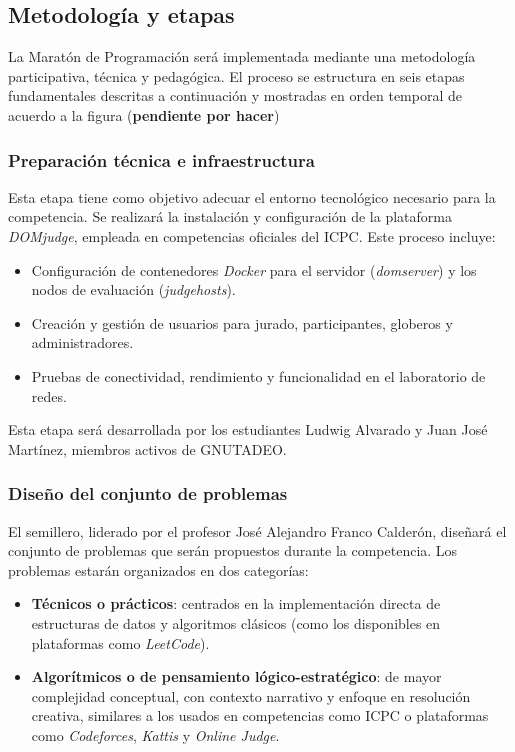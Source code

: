 \documentclass{article}
\begin{document}
\subsection{Metodología y etapas}

La Maratón de Programación será implementada mediante una metodología participativa, técnica y pedagógica. El proceso se estructura en seis etapas fundamentales descritas a continuación y mostradas en orden temporal de acuerdo a la figura (\textbf{pendiente por hacer})

\subsubsection{Preparación técnica e infraestructura}

Esta etapa tiene como objetivo adecuar el entorno tecnológico necesario para la competencia. Se realizará la instalación y configuración de la plataforma \textit{DOMjudge}, empleada en competencias oficiales del ICPC. Este proceso incluye:

\begin{itemize}
  \item Configuración de contenedores \textit{Docker} para el servidor (\textit{domserver}) y los nodos de evaluación (\textit{judgehosts})\cite{domjudge-domserver,domjudge-judgehost}.
  \item Creación y gestión de usuarios para jurado, participantes, globeros y administradores.
  \item Pruebas de conectividad, rendimiento y funcionalidad en el laboratorio de redes.
\end{itemize}

Esta etapa será desarrollada por los estudiantes Ludwig Alvarado y Juan José Martínez, miembros activos de GNUTADEO.

\subsubsection{Diseño del conjunto de problemas}

El semillero, liderado por el profesor José Alejandro Franco Calderón, diseñará el conjunto de problemas que serán propuestos durante la competencia. Los problemas estarán organizados en dos categorías:

\begin{itemize}
  \item \textbf{Técnicos o prácticos}: centrados en la implementación directa de estructuras de datos y algoritmos clásicos (como los disponibles en plataformas como \textit{LeetCode}\cite{leetcode}).
  \item \textbf{Algorítmicos o de pensamiento lógico-estratégico}: de mayor complejidad conceptual, con contexto narrativo y enfoque en resolución creativa, similares a los usados en competencias como ICPC o plataformas como \textit{Codeforces}, \textit{Kattis} y \textit{Online Judge}.
\end{itemize}
\end{document}
